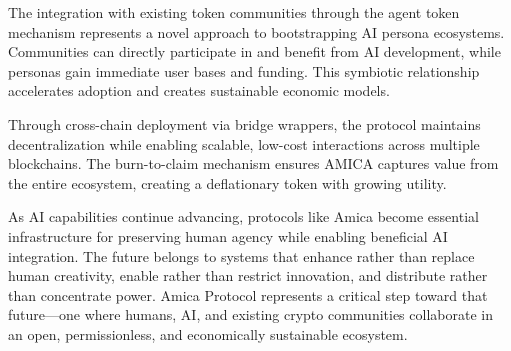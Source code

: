\documentclass{article}
\begin{document}
The integration with existing token communities through the agent token mechanism represents a novel approach to bootstrapping AI persona ecosystems. Communities can directly participate in and benefit from AI development, while personas gain immediate user bases and funding. This symbiotic relationship accelerates adoption and creates sustainable economic models.

Through cross-chain deployment via bridge wrappers, the protocol maintains decentralization while enabling scalable, low-cost interactions across multiple blockchains. The burn-to-claim mechanism ensures AMICA captures value from the entire ecosystem, creating a deflationary token with growing utility.

As AI capabilities continue advancing, protocols like Amica become essential infrastructure for preserving human agency while enabling beneficial AI integration. The future belongs to systems that enhance rather than replace human creativity, enable rather than restrict innovation, and distribute rather than concentrate power. Amica Protocol represents a critical step toward that future—one where humans, AI, and existing crypto communities collaborate in an open, permissionless, and economically sustainable ecosystem.
\end{document}
